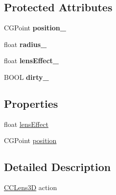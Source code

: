 \subsection*{Protected Attributes}
\begin{DoxyCompactItemize}
\item 
\hypertarget{interface_c_c_lens3_d_a50aadcd397615d1658a0313c3f1eecfc}{C\-G\-Point {\bfseries position\-\_\-}}\label{interface_c_c_lens3_d_a50aadcd397615d1658a0313c3f1eecfc}

\item 
\hypertarget{interface_c_c_lens3_d_adee6961664b50e0184fdefe842c8871c}{float {\bfseries radius\-\_\-}}\label{interface_c_c_lens3_d_adee6961664b50e0184fdefe842c8871c}

\item 
\hypertarget{interface_c_c_lens3_d_abc20473d02acffcb684985117bcff6a2}{float {\bfseries lens\-Effect\-\_\-}}\label{interface_c_c_lens3_d_abc20473d02acffcb684985117bcff6a2}

\item 
\hypertarget{interface_c_c_lens3_d_a7b23187a3680320c1a9085c2d425c951}{B\-O\-O\-L {\bfseries dirty\-\_\-}}\label{interface_c_c_lens3_d_a7b23187a3680320c1a9085c2d425c951}

\end{DoxyCompactItemize}
\subsection*{Properties}
\begin{DoxyCompactItemize}
\item 
float \hyperlink{interface_c_c_lens3_d_ab6e7fe6a6d007415eabafb1091750e9f}{lens\-Effect}
\item 
C\-G\-Point \hyperlink{interface_c_c_lens3_d_a2cc0045e4da4f80b39a529fb5ef6758e}{position}
\end{DoxyCompactItemize}


\subsection{Detailed Description}
\hyperlink{interface_c_c_lens3_d}{C\-C\-Lens3\-D} action 

